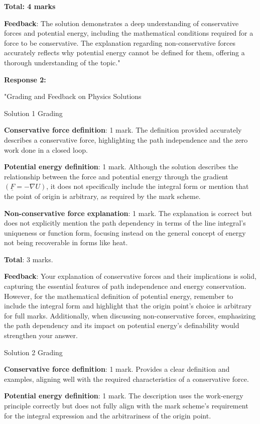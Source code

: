 \documentclass[a4paper,11pt]{article}
\begin{document}
\textbf{Total: 4 marks}

\textbf{Feedback}: The solution demonstrates a deep understanding of conservative forces and potential energy, including the mathematical conditions required for a force to be conservative. The explanation regarding non-conservative forces accurately reflects why potential energy cannot be defined for them, offering a thorough understanding of the topic."

\textbf{Response 2:}

"Grading and Feedback on Physics Solutions

Solution 1 Grading

\textbf{Conservative force definition}: 1 mark. The definition provided accurately describes a conservative force, highlighting the path independence and the zero work done in a closed loop.

\textbf{Potential energy definition}: 1 mark. Although the solution describes the relationship between the force and potential energy through the gradient \(( \underline{F} = -\nabla U )\), it does not specifically include the integral form or mention that the point of origin is arbitrary, as required by the mark scheme.

\textbf{Non-conservative force explanation}: 1 mark. The explanation is correct but does not explicitly mention the path dependency in terms of the line integral's uniqueness or function form, focusing instead on the general concept of energy not being recoverable in forms like heat.

\textbf{Total}: 3 marks.

\textbf{Feedback}: Your explanation of conservative forces and their implications is solid, capturing the essential features of path independence and energy conservation. However, for the mathematical definition of potential energy, remember to include the integral form and highlight that the origin point's choice is arbitrary for full marks. Additionally, when discussing non-conservative forces, emphasizing the path dependency and its impact on potential energy's definability would strengthen your answer.

Solution 2 Grading

\textbf{Conservative force definition}: 1 mark. Provides a clear definition and examples, aligning well with the required characteristics of a conservative force.

\textbf{Potential energy definition}: 1 mark. The description uses the work-energy principle correctly but does not fully align with the mark scheme's requirement for the integral expression and the arbitrariness of the origin point.
\end{document}
